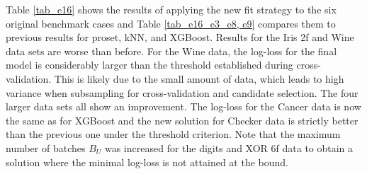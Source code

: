 %
Table \ref{tab_e16} shows the results of applying the new fit strategy to the six original benchmark cases and Table \ref{tab_e16_e3_e8, e9} compares them to previous results for proset, kNN, and XGBoost.
Results for the Iris 2f and Wine data sets are worse than before.
For the Wine data, the log-loss for the final model is considerably larger than the threshold established during cross-validation.
This is likely due to the small amount of data, which leads to high variance when subsampling for cross-validation and candidate selection.
The four larger data sets all show an improvement.
The log-loss for the Cancer data is now the same as for XGBoost and the new solution for Checker data is strictly better than the previous one under the threshold criterion.
Note that the maximum number of batches $B_U$ was increased for the digits and XOR 6f data to obtain a solution where the minimal log-loss is not attained at the bound.\par
%

